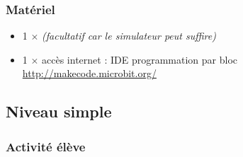 \subsubsection{Matériel}
\begin{itemize}
    \item 1 $\times$ \matosMb \emph{(facultatif car le simulateur peut suffire)}
    \item 1 $\times$ accès internet : IDE programmation par bloc \url{http://makecode.microbit.org/}
\end{itemize}


%
%
\newpage
\subsection{Niveau simple}
\subsubsection{Activité élève}



